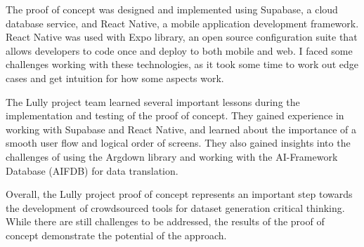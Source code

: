 \documentclass{report}
\begin{document}
The proof of concept was designed and implemented using Supabase, a cloud database service, and React Native, a mobile application development framework. React Native was used with Expo library, an open source configuration suite that allows developers to code once and deploy to both mobile and web. I faced some challenges working with these technologies, as it took some time to work out edge cases and get intuition for how some aspects work.


The Lully project team learned several important lessons during the implementation and testing of the proof of concept. They gained experience in working with Supabase and React Native, and learned about the importance of a smooth user flow and logical order of screens. They also gained insights into the challenges of using the Argdown library and working with the AI-Framework Database (AIFDB) for data translation.

Overall, the Lully project proof of concept represents an important step towards the development of crowdsourced tools for dataset generation critical thinking. While there are still challenges to be addressed, the results of the proof of concept demonstrate the potential of the approach.

\newpage

\printbibliography
\end{document}
